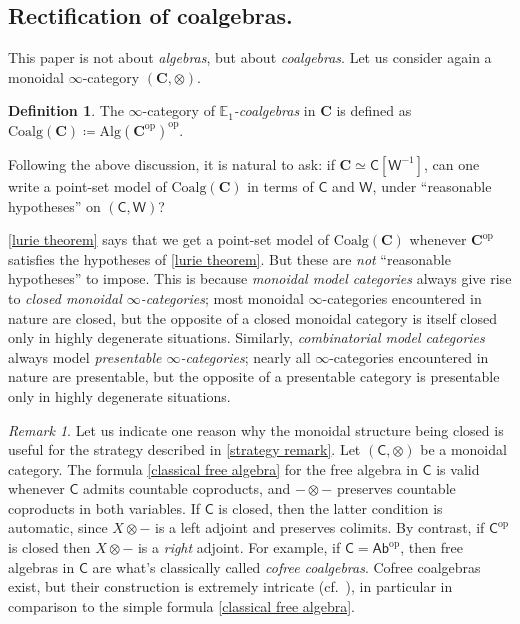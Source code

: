 \documentclass{proc-l}
\theoremstyle{plain}
\theoremstyle{definition}
\newtheorem{definition}[{theorem}]{Definition}
\theoremstyle{remark}
\newtheorem{remark}[{theorem}]{Remark}
\begin{document}
\subsection{Rectification of coalgebras.}%
\label{Section:1.2} This paper is not about \emph{algebras}, but about \emph{coalgebras}.
Let us consider again a monoidal $\infty$-category $(\mathbf C,\otimes)$.

\begin{definition}%
\label{Definition:1.3}\label{def:coalgebra}The $\infty$-category of \emph{$\mathbb E_1$-coalgebras} in $\mathbf{C}$ is defined as $\mathrm{Coalg}(\mathbf C) \coloneqq \mathrm{Alg}(\mathbf C^{\mathrm{op}})^{\mathrm{op}}$.
\end{definition}

Following the above discussion, it is natural to ask: if $\mathbf C \simeq \mathsf C[\mathsf W^{-1}]$, can one write a point-set model of $\mathrm{Coalg}(\mathbf C)$ in terms of $\mathsf C$ and $\mathsf W$, under ``reasonable hypotheses''  on $(\mathsf C,\mathsf W)$?

\cref{lurie theorem} says that we get a point-set model of $\mathrm{Coalg}(\mathbf C)$ whenever $\mathbf C^{\mathrm{op}}$ satisfies the hypotheses of \cref{lurie theorem}. But these are \emph{not} ``reasonable hypotheses'' to impose. This is because \emph{monoidal model categories} always give rise to \emph{closed monoidal $\infty$-categories}; most monoidal $\infty$-categories encountered in nature are closed, but the opposite of a closed monoidal category is  itself closed only in highly degenerate situations.  Similarly, \emph{combinatorial model categories} always model \emph{presentable $\infty$-categories}; nearly all  $\infty$-categories encountered in nature are presentable, but the opposite of a presentable category is  presentable only in highly degenerate situations.

\begin{remark}%
\label{Remark:1.4}\label{cofree are complicated}Let us indicate one reason why the monoidal structure being closed is useful for the strategy described in \cref{strategy remark}. Let $(\mathsf C,\otimes)$ be a monoidal category. The formula \eqref{classical free algebra} for the free algebra in $\mathsf C$ is valid whenever $\mathsf C$ admits countable coproducts, and $-\otimes-$ preserves countable coproducts in both variables. If $\mathsf C$ is closed, then the latter condition is automatic, since $X \otimes -$ is a left adjoint and preserves colimits. By contrast, if $\mathsf C^{\mathrm{op}}$ is closed then $X \otimes -$ is a \emph{right} adjoint. For example, if $\mathsf C = \mathsf{Ab}^{\mathrm{op}}$, then free algebras in $\mathsf C$ are what's classically called \emph{cofree coalgebras}. Cofree coalgebras exist, but their construction is extremely intricate (cf.~\cite{fox,Hazewinkel03}), in particular in comparison to the simple formula \eqref{classical free algebra}.

\end{remark}
\end{document}
